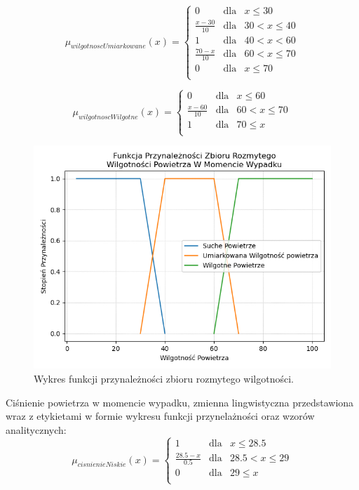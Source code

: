 \documentclass{classrep}
\begin{document}
\begin{equation}
\mu _{wilgotnoscUmiarkowane}(x) =  \left\{ \begin{array}{rcl}
 0 & \mbox{dla} & x  \leq 30 \\
\frac{x - 30}{10} & \mbox{dla} & 30 < x \leq 40\\
1 & \mbox{dla} & 40 < x < 60\\
\frac{70 - x}{10} & \mbox{dla} & 60 < x \leq 70\\
 0 & \mbox{dla} & x  \leq 70 \\
\end{array}\right.
\end{equation}

\begin{equation}
\mu _{wilgotnoscWilgotne}(x) =  \left\{ \begin{array}{rcl}
 0 & \mbox{dla} & x \leq 60 \\
\frac{x - 60}{10} & \mbox{dla} & 60 < x \leq 70\\
1 & \mbox{dla} & 70 \leq x\\
\end{array}\right.
\end{equation}

\begin{figure}[h!]
 \centering
 \includegraphics[width=14cm]{FunkcjaPrzynaleznosciWilgotnosc.png}
 \vspace{-0.3cm}
 \caption{Wykres funkcji przynależności zbioru rozmytego wilgotności. }
 \label{rysunek do eksperymentu 1 wariantu 1}
\end{figure}
\newpage


Ciśnienie powietrza w momencie wypadku, zmienna lingwistyczna przedstawiona wraz z etykietami w formie wykresu funkcji przynelażności oraz wzorów analitycznych:
\begin{equation}
\mu _{cisnienieNiskie}(x) =  \left\{ \begin{array}{rcl}
 1 & \mbox{dla} & x  \leq 28.5 \\
\frac{28.5 - x}{0.5} & \mbox{dla} & 28.5 < x \leq 29\\
0 & \mbox{dla} & 29 \leq x\\
\end{array}\right.
\end{equation}
\end{document}
